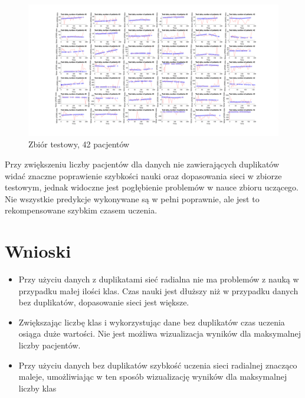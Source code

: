 \documentclass[12pt]{article}
\begin{document}
\begin{figure}[h!]

\centering
\includegraphics[width=1.1\textwidth]{test-cut-42.png}
\caption{Zbiór testowy, 42 pacjentów}

\end{figure}

Przy zwiększeniu liczby pacjentów dla danych nie zawierających duplikatów widać znaczne poprawienie szybkości nauki oraz dopasowania sieci w zbiorze testowym, jednak widoczne jest pogłębienie problemów w nauce zbioru uczącego. Nie wszystkie predykcje wykonywane są w pełni poprawnie, ale jest to rekompensowane szybkim czasem uczenia.

\newpage
\section{Wnioski}

\begin{itemize}
\item Przy użyciu danych z duplikatami sieć radialna nie ma problemów z nauką w przypadku małej ilości klas. Czas nauki jest dłuższy niż w przypadku danych bez duplikatów, dopasowanie sieci jest większe.
\item Zwiększając liczbę klas i wykorzystując dane bez duplikatów czas uczenia osiąga duże wartości. Nie jest możliwa wizualizacja wyników dla maksymalnej liczby pacjentów.
\item Przy użyciu danych bez duplikatów szybkość uczenia sieci radialnej znacząco maleje, umożliwiając w ten sposób wizualizację wyników dla maksymalnej liczby klas
\end{itemize}
\end{document}
